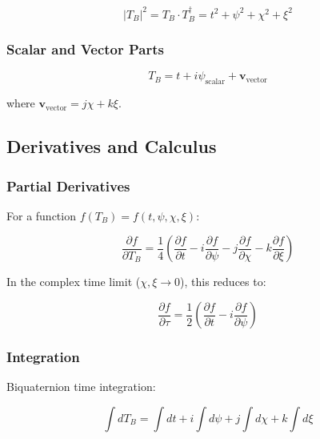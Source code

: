 \begin{equation}
\label{eq:canonical:tb_norm}
|T_B|^2 = T_B \cdot T_B^\dagger = t^2 + \psi^2 + \chi^2 + \xi^2
\end{equation}

\subsubsection{Scalar and Vector Parts}

\begin{equation}
\label{eq:canonical:tb_decomposition}
T_B = t + i\psi_{\text{scalar}} + \mathbf{v}_{\text{vector}}
\end{equation}

where $\mathbf{v}_{\text{vector}} = j\chi + k\xi$.

\subsection{Derivatives and Calculus}

\subsubsection{Partial Derivatives}

For a function $f(T_B) = f(t,\psi,\chi,\xi)$:

\begin{equation}
\label{eq:canonical:tb_derivatives}
\frac{\partial f}{\partial T_B} = \frac{1}{4}\left(\frac{\partial f}{\partial t} - i\frac{\partial f}{\partial \psi} - j\frac{\partial f}{\partial \chi} - k\frac{\partial f}{\partial \xi}\right)
\end{equation}

In the complex time limit ($\chi, \xi \to 0$), this reduces to:

\begin{equation}
\frac{\partial f}{\partial \tau} = \frac{1}{2}\left(\frac{\partial f}{\partial t} - i\frac{\partial f}{\partial \psi}\right)
\end{equation}

\subsubsection{Integration}

Biquaternion time integration:

\begin{equation}
\label{eq:canonical:tb_integration}
\int dT_B = \int dt + i \int d\psi + j \int d\chi + k \int d\xi
\end{equation}

